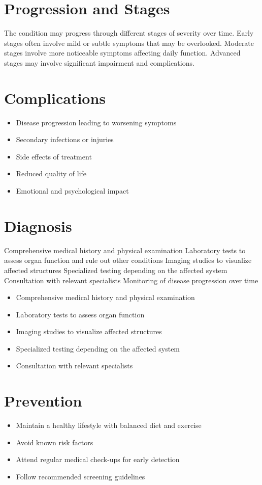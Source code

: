 \section{Progression and Stages}
The condition may progress through different stages of severity over time. Early stages often involve mild or subtle symptoms that may be overlooked. Moderate stages involve more noticeable symptoms affecting daily function. Advanced stages may involve significant impairment and complications.
\section{Complications}
\begin{itemize}[noitemsep]
  \item Disease progression leading to worsening symptoms
  \item Secondary infections or injuries
  \item Side effects of treatment
  \item Reduced quality of life
  \item Emotional and psychological impact
\end{itemize}
\section{Diagnosis}
Comprehensive medical history and physical examination Laboratory tests to assess organ function and rule out other conditions Imaging studies to visualize affected structures Specialized testing depending on the affected system Consultation with relevant specialists Monitoring of disease progression over time

\begin{itemize}[noitemsep]
  \item Comprehensive medical history and physical examination
  \item Laboratory tests to assess organ function
  \item Imaging studies to visualize affected structures
  \item Specialized testing depending on the affected system
  \item Consultation with relevant specialists
\end{itemize}
\section{Prevention}
\begin{itemize}[noitemsep]
  \item Maintain a healthy lifestyle with balanced diet and exercise
  \item Avoid known risk factors
  \item Attend regular medical check-ups for early detection
  \item Follow recommended screening guidelines
\end{itemize}
